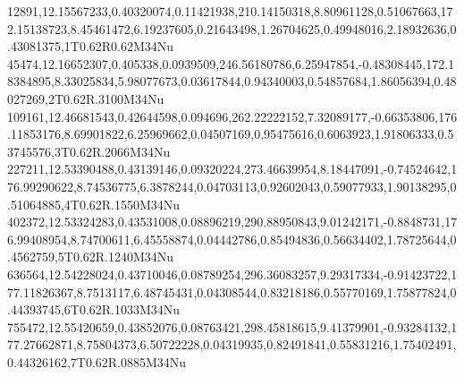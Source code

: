 12891,12.15567233,0.40320074,0.11421938,210.14150318,8.80961128,0.51067663,172.15138723,8.45461472,6.19237605,0.21643498,1.26704625,0.49948016,2.18932636,0.43081375,1T0.62R0.62M34Nu
45474,12.16652307,0.405338,0.0939509,246.56180786,6.25947854,-0.48308445,172.18384895,8.33025834,5.98077673,0.03617844,0.94340003,0.54857684,1.86056394,0.48027269,2T0.62R.3100M34Nu
109161,12.46681543,0.42644598,0.094696,262.22222152,7.32089177,-0.66353806,176.11853176,8.69901822,6.25969662,0.04507169,0.95475616,0.6063923,1.91806333,0.53745576,3T0.62R.2066M34Nu
227211,12.53390488,0.43139146,0.09320224,273.46639954,8.18447091,-0.74524642,176.99290622,8.74536775,6.3878244,0.04703113,0.92602043,0.59077933,1.90138295,0.51064885,4T0.62R.1550M34Nu
402372,12.53324283,0.43531008,0.08896219,290.88950843,9.01242171,-0.8848731,176.99408954,8.74700611,6.45558874,0.04442786,0.85494836,0.56634402,1.78725644,0.4562759,5T0.62R.1240M34Nu
636564,12.54228024,0.43710046,0.08789254,296.36083257,9.29317334,-0.91423722,177.11826367,8.7513117,6.48745431,0.04308544,0.83218186,0.55770169,1.75877824,0.44393745,6T0.62R.1033M34Nu
755472,12.55420659,0.43852076,0.08763421,298.45818615,9.41379901,-0.93284132,177.27662871,8.75804373,6.50722228,0.04319935,0.82491841,0.55831216,1.75402491,0.44326162,7T0.62R.0885M34Nu
